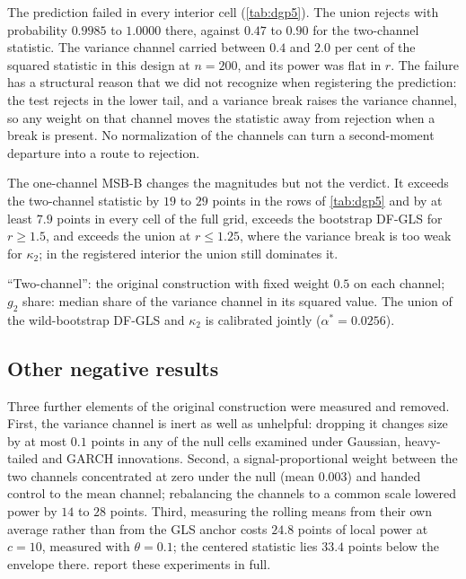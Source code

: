 \documentclass[11pt]{article}
\newcommand{\RMGLS}{MSB-B}
\begin{document}
The prediction failed in every interior cell (\cref{tab:dgp5}). The union
rejects with probability $0.9985$ to $1.0000$ there, against $0.47$ to
$0.90$ for the two-channel statistic. The variance channel carried
between $0.4$ and $2.0$ per cent of the squared statistic in this design
at $n = 200$,
and its power was flat in $r$. The failure has a structural reason that we
did not recognize when registering the prediction: the test rejects in
the lower tail, and a variance break raises the variance channel, so any
weight on that channel moves the statistic away from rejection when a
break is present. No normalization of the channels can turn a
second-moment departure into a route to rejection.

The one-channel \RMGLS{} changes the magnitudes but not the verdict. It
exceeds the two-channel statistic by $19$ to $29$ points in the rows of
\cref{tab:dgp5} and by at least $7.9$ points in every cell of the full grid,
exceeds the bootstrap DF-GLS for $r \geq 1.5$, and exceeds the union at $r
\leq 1.25$, where the variance break is too weak for $\kappa_2$; in the
registered interior the union still dominates it.

\begin{table}[t]
\centering
\caption{Pre-registered experiment: stationary AR$(1)$ with a mid-sample
variance break of ratio $r$, $n=200$, power at equalized size.}
\label{tab:dgp5}
\begin{threeparttable}
\small

\begin{tablenotes}\footnotesize
\item ``Two-channel'': the original
construction with fixed weight $0.5$ on each channel; $g_2$ share: median
share of the variance channel in its squared value. The union of the
wild-bootstrap DF-GLS and $\kappa_2$ is calibrated jointly
($\alpha^\ast = 0.0256$).
\end{tablenotes}
\end{threeparttable}
\end{table}

\subsection*{Other negative results}

Three further elements of the original construction were measured and
removed. First, the variance channel is inert as well as unhelpful:
dropping it changes size by at most $0.1$ points in any of the null
cells examined under Gaussian, heavy-tailed and GARCH innovations. Second, a
signal-proportional weight between the two channels concentrated at zero
under the null (mean $0.003$) and handed control to the mean channel;
rebalancing the channels to a common scale lowered power by $14$ to $28$
points. Third, measuring the rolling means from their own average rather
than from the GLS anchor costs $24.8$ points of local power at $c = 10$,
measured with $\theta = 0.1$; the centered statistic lies $33.4$ points
below the envelope there.  report these experiments in full.
\end{document}
